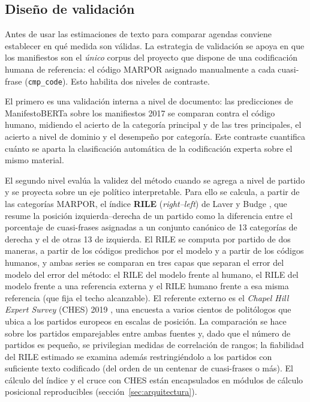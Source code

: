 \subsection{Diseño de validación}
\label{sec:metodo-validacion}

Antes de usar las estimaciones de texto para comparar agendas conviene
establecer en qué medida son válidas. La estrategia de validación se apoya en
que los manifiestos son el \emph{único} corpus del proyecto que dispone de una
codificación humana de referencia: el código MARPOR asignado manualmente a cada
cuasi-frase (\texttt{cmp\_code}). Esto habilita dos niveles de contraste.

El primero es una validación interna a nivel de documento: las predicciones de
ManifestoBERTa sobre los manifiestos 2017 se comparan contra el código humano,
midiendo el acierto de la categoría principal y de las tres principales, el
acierto a nivel de dominio y el desempeño por categoría. Este contraste cuantifica
cuánto se aparta la clasificación automática de la codificación experta sobre el
mismo material.

El segundo nivel evalúa la validez del método cuando se agrega a nivel de
partido y se proyecta sobre un eje político interpretable. Para ello se calcula,
a partir de las categorías MARPOR, el índice \textbf{RILE}
(\emph{right--left}) de Laver y Budge \cite{laver1992party}, que resume la
posición izquierda--derecha de un partido como la diferencia entre el porcentaje
de cuasi-frases asignadas a un conjunto canónico de 13 categorías de derecha y el
de otras 13 de izquierda. El RILE se computa por partido de dos maneras, a
partir de los códigos predichos por el modelo y a partir de los códigos
humanos, y ambas series se comparan en tres capas que separan el error del
modelo del error del método: el RILE del modelo frente al humano, el RILE del
modelo frente a una referencia externa y el RILE humano frente a esa misma
referencia (que fija el techo alcanzable). El referente externo es el
\emph{Chapel Hill Expert Survey} (CHES) 2019 \cite{jolly2022ches, ches2019data},
una encuesta a varios cientos de politólogos que ubica a los partidos europeos en
escalas de posición. La
comparación se hace sobre los partidos emparejables entre ambas fuentes y, dado
que el número de partidos es pequeño, se privilegian medidas de correlación de
rangos; la fiabilidad del RILE estimado se examina además restringiéndolo a los
partidos con suficiente texto codificado (del orden de un centenar de cuasi-frases
o más). El cálculo del índice y el cruce con CHES están encapsulados en módulos
de cálculo posicional reproducibles (sección~\ref{sec:arquitectura}).

